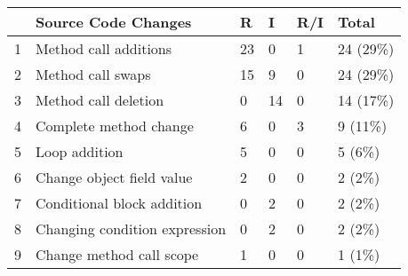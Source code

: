 \documentclass[article,type=msc,colorback,12pt,accentcolor=tud8b,table]{tudthesis}
\begin{document}
\begin{enumerate}
\begin{table}[]
	\centering
	\label{tab:Table2}
	\begin{tabular}{|l|l|l|l|l|l|}
		\hline
		& \cellcolor[HTML]{FFD27F}\textbf{Source Code Changes} & \cellcolor[HTML]{FFD27F}\textbf{R} & \cellcolor[HTML]{FFD27F}\textbf{I} & \cellcolor[HTML]{FFD27F}\textbf{R/I} & \cellcolor[HTML]{FFD27F}\textbf{Total} \\ \hline
		1  & Method call additions                                & 23                                 & 0                                  & 1                                    & 24 (29\%)                              \\ \hline
		2  & Method call swaps                                    & 15                                 & 9                                  & 0                                    & 24 (29\%)                              \\ \hline
		3  & Method call deletion                                 & 0                                  & 14                                 & 0                                    & 14 (17\%)                              \\ \hline
		4  & Complete method change                               & 6                                  & 0                                  & 3                                    & 9 (11\%)                               \\ \hline
		5  & Loop addition                                        & 5                                  & 0                                  & 0                                    & 5 (6\%)                                \\ \hline
		6  & Change object field value                            & 2                                  & 0                                  & 0                                    & 2 (2\%)                                \\ \hline
		7  & Conditional block addition                           & 0                                  & 2                                  & 0                                    & 2 (2\%)                                \\ \hline
		8  & Changing condition expression                        & 0                                  & 2                                  & 0                                    & 2 (2\%)                                \\ \hline
		9  & Change method call scope                             & 1                                  & 0                                  & 0                                    & 1 (1\%)                                \\ \hline

\end{tabular}
\end{table}
\end{enumerate}
\end{document}
